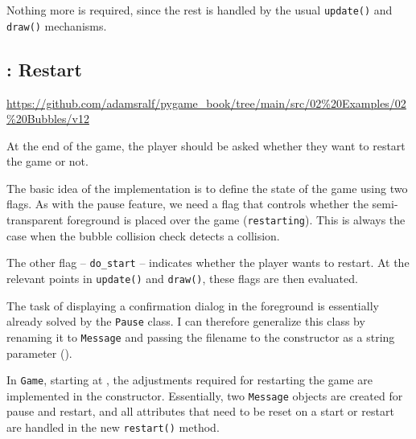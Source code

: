 Nothing more is required, since the rest is handled by the usual \texttt{update()} and \texttt{draw()} mechanisms.

\subsection{: Restart}
\begin{diskbox}
	\url{https://github.com/adamsralf/pygame_book/tree/main/src/02%20Examples/02%20Bubbles/v12}
\end{diskbox}

	At the end of the game, the player should be asked whether they want to restart the game or not.
\er

The basic idea of the implementation is to define the state of the game using two flags. As with the pause feature, we need a flag that controls whether the semi-transparent foreground is placed over the game (\texttt{restarting}). This is always the case when the bubble collision check detects a collision.

The other flag -- \texttt{do\_start} -- indicates whether the player wants to restart. At the relevant points in \texttt{update()} and \texttt{draw()}, these flags are then evaluated.

The task of displaying a confirmation dialog in the foreground is essentially already solved by the \texttt{Pause} class. I can therefore generalize this class by renaming it to \texttt{Message} and passing the filename to the constructor as a string parameter ().



In \texttt{Game}, starting at , the adjustments required for restarting the game are implemented in the constructor. Essentially, two \texttt{Message} objects are created for pause and restart, and all attributes that need to be reset on a start or restart are handled in the new \texttt{restart()} method.



